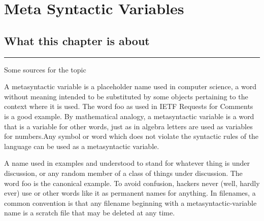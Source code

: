 \documentclass[thesis-solanki.tex]{subfiles}
\begin{document}
\chapter{Meta Syntactic Variables}\label{chap:metasyntacticvariables}

\section{What this chapter is about}

\noindent\rule{\textwidth}{0.5pt}


Some sources for the topic 


\cite{website:metasyntacticvariableswiki}
A metasyntactic variable is a placeholder name used in computer science, a word without meaning intended to be substituted by some objects pertaining to the context where it is used. The word foo as used in IETF Requests for Comments is a good example.
By mathematical analogy, a metasyntactic variable is a word that is a variable for other words, just as in algebra letters are used as variables for numbers.Any symbol or word which does not violate the syntactic rules of the language can be used as a metasyntactic variable.




\cite{webiste:metasyntacticvariablescatb}
A name used in examples and understood to stand for whatever thing is under discussion, or any random member of a class of things under discussion. The word foo is the canonical example. To avoid confusion, hackers never (well, hardly ever) use 
or other words like it as permanent names for anything. In filenames, a common convention is that any filename beginning with a metasyntactic-variable name is a scratch file that may be deleted at any time.
\end{document}
